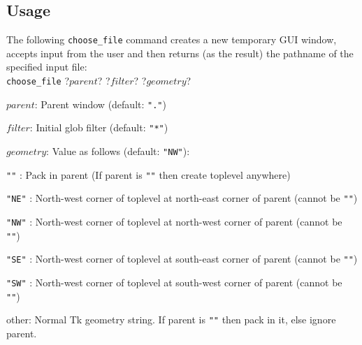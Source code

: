 \subsection{Usage}
\label{choose-file-Usage}

The following \texttt{choose\_file} command creates a new temporary GUI window,
accepts input from the user and
then returns (as the result) the pathname of the specified input file:
\\
\texttt{choose\_file} ?$\mathit{parent}$? ?$\mathit{filter}$? ?$\mathit{geometry}$?
\begin{simpleitems}
    \item $\mathit{parent}$: Parent window (default: \texttt{"."})
    \item $\mathit{filter}$: Initial glob filter (default: \texttt{"*"})
    \item $\mathit{geometry}$: Value as follows (default: \texttt{"NW"}):
	\begin{simpleitems}
	    \item \texttt{""}   : Pack in parent 
		(If parent is \texttt{""} then create toplevel anywhere)
	    \item \texttt{"NE"} : North-west corner of toplevel at north-east
		corner of parent (cannot be \texttt{""})
	    \item \texttt{"NW"} : North-west corner of toplevel at north-west
		corner of parent (cannot be \texttt{""})
	    \item \texttt{"SE"} : North-west corner of toplevel at south-east
		corner of parent (cannot be \texttt{""})
	    \item \texttt{"SW"} : North-west corner of toplevel at south-west
		corner of parent (cannot be \texttt{""})
	    \item other: Normal Tk geometry string.
		If parent is \texttt{""} then pack in it, else ignore parent.
	\end{simpleitems}
\end{simpleitems}
